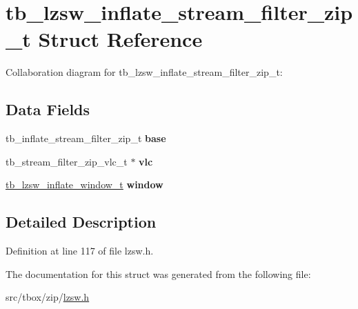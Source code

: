 \hypertarget{structtb__lzsw__inflate__stream__filter__zip__t}{\section{tb\-\_\-lzsw\-\_\-inflate\-\_\-stream\-\_\-filter\-\_\-zip\-\_\-t Struct Reference}
\label{structtb__lzsw__inflate__stream__filter__zip__t}
}


Collaboration diagram for tb\-\_\-lzsw\-\_\-inflate\-\_\-stream\-\_\-filter\-\_\-zip\-\_\-t\-:
\subsection*{Data Fields}
\begin{DoxyCompactItemize}
\item 
\hypertarget{structtb__lzsw__inflate__stream__filter__zip__t_a3c9fe2c361b4d2de2d727a497bae2256}{tb\-\_\-inflate\-\_\-stream\-\_\-filter\-\_\-zip\-\_\-t {\bfseries base}}\label{structtb__lzsw__inflate__stream__filter__zip__t_a3c9fe2c361b4d2de2d727a497bae2256}

\item 
\hypertarget{structtb__lzsw__inflate__stream__filter__zip__t_ac53e37215d15c85453bb381eba948c54}{tb\-\_\-stream\-\_\-filter\-\_\-zip\-\_\-vlc\-\_\-t $\ast$ {\bfseries vlc}}\label{structtb__lzsw__inflate__stream__filter__zip__t_ac53e37215d15c85453bb381eba948c54}

\item 
\hypertarget{structtb__lzsw__inflate__stream__filter__zip__t_a8954818e6ae456f30995888aa1adac7a}{\hyperlink{structtb__lzsw__inflate__window__t}{tb\-\_\-lzsw\-\_\-inflate\-\_\-window\-\_\-t} {\bfseries window}}\label{structtb__lzsw__inflate__stream__filter__zip__t_a8954818e6ae456f30995888aa1adac7a}

\end{DoxyCompactItemize}


\subsection{Detailed Description}


Definition at line 117 of file lzsw.\-h.



The documentation for this struct was generated from the following file\-:\begin{DoxyCompactItemize}
\item 
src/tbox/zip/\hyperlink{lzsw_8h}{lzsw.\-h}\end{DoxyCompactItemize}
